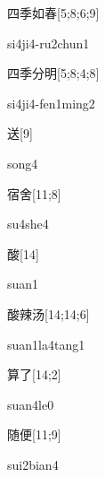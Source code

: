 \begin{verbete}[si4ji4-ru2chun1]{四季如春}[5;8;6;9]
\begin{pronuncia}[\\]{si4ji4-ru2chun1}
\end{pronuncia}
\end{verbete}

\begin{verbete}{四季分明}[5;8;4;8]
\begin{pronuncia}[\\]{si4ji4-fen1ming2}
\end{pronuncia}
\end{verbete}

\begin{verbete}[song4]{送}[9]
\begin{pronuncia}{song4}
\end{pronuncia}
\end{verbete}

\begin{verbete}[su4she4]{宿舍}[11;8]
\begin{pronuncia}{su4she4}
\end{pronuncia}
\end{verbete}

\begin{verbete}[suan1]{酸}[14]
\begin{pronuncia}{suan1}
\end{pronuncia}
\end{verbete}

\begin{verbete}{酸辣汤}[14;14;6]
\begin{pronuncia}{suan1la4tang1}
\end{pronuncia}
\end{verbete}

\begin{verbete}[suan4le0]{算了}[14;2]
\begin{pronuncia}{suan4le0}
\end{pronuncia}
\end{verbete}

\begin{verbete}{随便}[11;9]
\begin{pronuncia}{sui2bian4}
\end{pronuncia}
\end{verbete}

